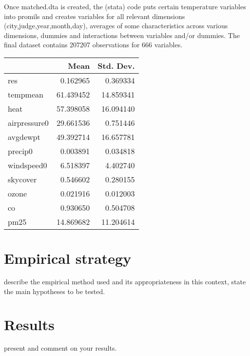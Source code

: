 \documentclass[11pt]{article}
\begin{document}
	Once matched.dta is created, the (stata) code puts certain temperature variables into promils and creates variables for all relevant dimensions (city,judge,year,month,day), averages of some characteristics across various dimensions, dummies and interactions between variables and/or dummies. The final dataset contains 207207 observations for 666 variables. \newline	
	
	
	\begin{tabular}{lrr}
		\toprule
		{} &       Mean &  Std. Dev. \\
		\midrule
		res          &   0.162965 &   0.369334 \\
		tempmean     &  61.439452 &  14.859341 \\
		heat         &  57.398058 &  16.094140 \\
		airpressure0 &  29.661536 &   0.751446 \\
		avgdewpt     &  49.392714 &  16.657781 \\
		precip0      &   0.003891 &   0.034818 \\
		windspeed0   &   6.518397 &   4.402740 \\
		skycover     &   0.546602 &   0.280155 \\
		ozone        &   0.021916 &   0.012003 \\
		co           &   0.930650 &   0.504708 \\
		pm25         &  14.869682 &  11.204614 \\
		\bottomrule
	\end{tabular}
	
	\section{Empirical strategy}
	describe the empirical method used and its appropriateness in this
	context, state the main hypotheses to be tested.
	\section{Results}
	present and comment on your results.
	
\end{document}
